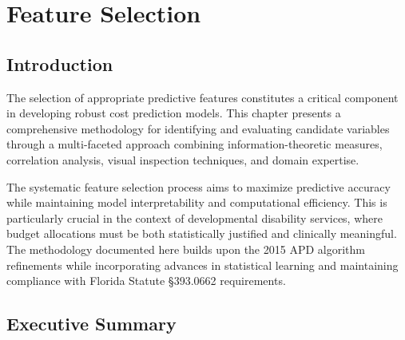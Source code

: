 


\providecommand{\FSExampleYear}{2025}

\graphicspath{{figures/}{./figures/}}

\chapter{Feature Selection}
\label{ch:feature-selection}

\section{Introduction}

The selection of appropriate predictive features constitutes a critical component in developing robust cost prediction models. This chapter presents a comprehensive methodology for identifying and evaluating candidate variables through a multi-faceted approach combining information-theoretic measures, correlation analysis, visual inspection techniques, and domain expertise. 

The systematic feature selection process aims to maximize predictive accuracy while maintaining model interpretability and computational efficiency. This is particularly crucial in the context of developmental disability services, where budget allocations must be both statistically justified and clinically meaningful. The methodology documented here builds upon the 2015 APD algorithm refinements while incorporating advances in statistical learning and maintaining compliance with Florida Statute §393.0662 requirements.


\section{Executive Summary}

